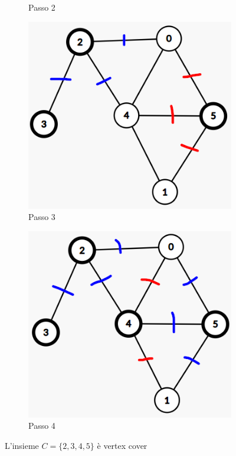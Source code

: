 \documentclass{article}  %
\theoremstyle{definition}
\begin{document}
\begin{figure}[h]
\begin{subfigure}[b]{0.24\textwidth}
		\caption{Passo 2}
	\end{subfigure}
	\hfill
	\begin{subfigure}[b]{0.24\textwidth}
		\centering
		\includegraphics[width=\textwidth]{vc3.png}
		\caption{Passo 3}
	\end{subfigure}
	\hfill
	\begin{subfigure}[b]{0.24\textwidth}
		\centering
		\includegraphics[width=\textwidth]{vc4.png}
		\caption{Passo 4}
	\end{subfigure}
	\caption{L'insieme $C=\{2,3,4,5\}$ è vertex cover}
\end{figure}
\end{document}
